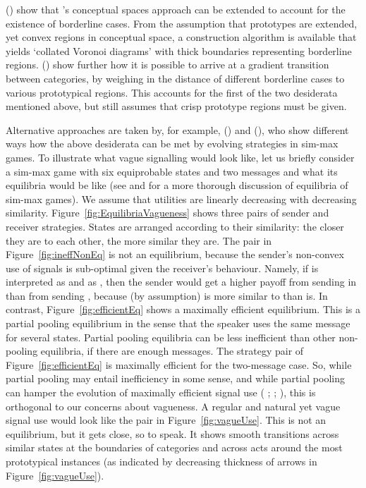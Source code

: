 \documentclass[11pt,english]{article}
\numberwithin{equation}{section}
\newcommand{\citetbjps}[1]{\citeauthor{#1} (\citeyear{#1})}
\newcommand{\citealtbjps}[1]{\citeauthor{#1} \citeyear{#1}}
\begin{document}
\citetbjps{DouvenDecock2011:Vagueness:-A-Co} show that
\citeauthor{Gardenfors2000:Conceptual-Spac}'s conceptual spaces
approach can be extended to account for the existence of borderline
cases. From the assumption that prototypes are extended, yet convex
regions in conceptual space, a construction algorithm is available
that yields `collated Voronoi diagrams' with thick boundaries
representing borderline
regions. \citetbjps{DecockDouven2012:What-is-Graded-} show further how it
is possible to arrive at a gradient transition between categories, by
weighing in the distance of different borderline cases to various
prototypical regions. This accounts for the first of the two
desiderata mentioned above, but still assumes that crisp prototype
regions must be given.

Alternative approaches are taken by, for example, \citetbjps{FrankeJager2010:Vagueness-Signa} and
\citetbjps{OConnor2013:The-Evolution-o}, who show different ways how the above desiderata can be
met by evolving strategies in sim-max games. To illustrate what vague signalling would look
like, let us briefly consider a sim-max game with six equiprobable states and two messages and
what its equilibria would be like (see \citealtbjps{Jager2007:The-Evolution-o} and \citealtbjps{OConnor2013:The-Evolution-o} for a more thorough discussion of equilibria of
sim-max games). We assume that utilities
are linearly decreasing with decreasing similarity. Figure~\ref{fig:EquilibriaVagueness} shows
three pairs of sender and receiver strategies. States are arranged according to their
similarity: the closer they are to each other, the more similar they are. The pair in
Figure~\ref{fig:ineffNonEq} is not an equilibrium, because the sender's non-convex use of
signals is sub-optimal given the receiver's behaviour. Namely, if  is interpreted as
 and  as , then the sender would get a higher payoff from
sending  in  than from sending , because (by assumption)
 is more similar to  than  is. In contrast,
Figure~\ref{fig:efficientEq} shows a maximally efficient equilibrium. This is a partial pooling
equilibrium in the sense that the speaker uses the same message for several states. Partial
pooling equilibria can be less inefficient than other non-pooling equilibria, if there are
enough messages. The strategy pair of Figure~\ref{fig:efficientEq} is maximally efficient for
the two-message case. So, while partial pooling may entail inefficiency in some sense, and
while partial pooling can hamper the evolution of maximally efficient signal use
(\citealtbjps{Hutteger:2007-Evol-Indicatives-Imperatives}; \citealtbjps{Pawlowitsch2008:Why-Evolution-d}; \citealtbjps{HutteggerSkyrms2010:Evolutionary-Dy}),
this is orthogonal to our concerns about vagueness. A regular and natural yet vague signal use
would look like the pair in Figure~\ref{fig:vagueUse}. This is not an equilibrium, but it gets
close, so to speak. It shows smooth transitions across similar states at the boundaries of
categories and across acts around the most prototypical instances (as indicated by decreasing
thickness of arrows in Figure~\ref{fig:vagueUse}).
\end{document}
